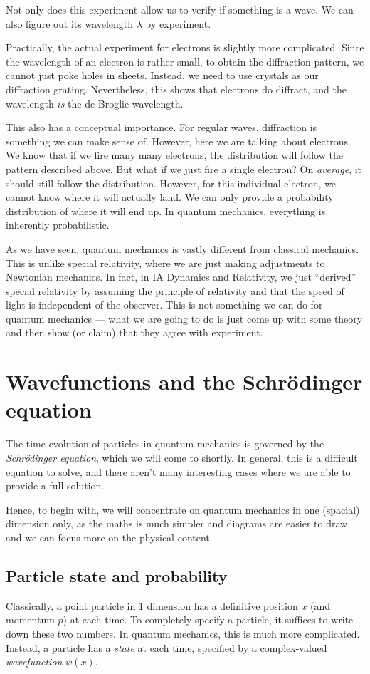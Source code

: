 \documentclass[a4paper]{article}
\begin{document}
Not only does this experiment allow us to verify if something is a wave. We can also figure out its wavelength $\lambda$ by experiment.

Practically, the actual experiment for electrons is slightly more complicated. Since the wavelength of an electron is rather small, to obtain the diffraction pattern, we cannot just poke holes in sheets. Instead, we need to use crystals as our diffraction grating. Nevertheless, this shows that electrons do diffract, and the wavelength \emph{is} the de Broglie wavelength.

This also has a conceptual importance. For regular waves, diffraction is something we can make sense of. However, here we are talking about electrons. We know that if we fire many many electrons, the distribution will follow the pattern described above. But what if we just fire a single electron? On \emph{average}, it should still follow the distribution. However, for this individual electron, we cannot know where it will actually land. We can only provide a probability distribution of where it will end up. In quantum mechanics, everything is inherently probabilistic.

As we have seen, quantum mechanics is vastly different from classical mechanics. This is unlike special relativity, where we are just making adjustments to Newtonian mechanics. In fact, in IA Dynamics and Relativity, we just ``derived'' special relativity by assuming the principle of relativity and that the speed of light is independent of the observer. This is not something we can do for quantum mechanics --- what we are going to do is just come up with some theory and then show (or claim) that they agree with experiment.

\section{Wavefunctions and the Schr\texorpdfstring{\"o}{o}dinger equation}
The time evolution of particles in quantum mechanics is governed by the \emph{Schr\"odinger equation}, which we will come to shortly. In general, this is a difficult equation to solve, and there aren't many interesting cases where we are able to provide a full solution.

Hence, to begin with, we will concentrate on quantum mechanics in one (spacial) dimension only, as the maths is much simpler and diagrams are easier to draw, and we can focus more on the physical content.

\subsection{Particle state and probability}
Classically, a point particle in 1 dimension has a definitive position $x$ (and momentum $p$) at each time. To completely specify a particle, it suffices to write down these two numbers. In quantum mechanics, this is much more complicated. Instead, a particle has a \emph{state} at each time, specified by a complex-valued \emph{wavefunction} $\psi(x)$.
\end{document}
